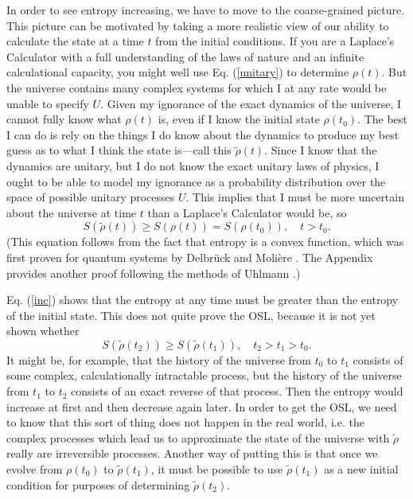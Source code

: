 \documentclass[12pt]{article}
\begin{document}
In order to see entropy increasing, we have to move to the coarse-grained picture.  This picture can be motivated by taking a more realistic view of our ability to calculate the state at a time $t$ from the initial conditions.  If you are a Laplace's Calculator with a full understanding of the laws of nature and an infinite calculational capacity, you might well use Eq. (\ref{unitary}) to determine $\rho(t)$.  But the universe contains many complex systems for which I at any rate would be unable to specify $U$.  Given my ignorance of the exact dynamics of the universe, I cannot fully know what $\rho(t)$ is, even if I know the initial state $\rho(t_0)$.  The best I can do is rely on the things I do know about the dynamics to produce my best guess as to what I think the state is---call this $\tilde{\rho}(t)$.  Since I know that the dynamics are unitary, but I do not know the exact unitary laws of physics, I ought to be able to model my ignorance as a probability distribution over the space of possible unitary processes $U$.  This implies that I must be more uncertain about the universe at time $t$ than a Laplace's Calculator would be, so 
\begin{equation}\label{inc}
S(\tilde{\rho}(t)) \ge S(\rho(t)) = S(\rho(t_0)), \quad t > t_0.
\end{equation}
(This equation follows from the fact that entropy is a convex function, which was first proven for quantum systems by Delbr\"uck and Moli\`ere \cite{convex}.  The Appendix provides another proof following the methods of Uhlmann \cite{Uhlmann}.)

Eq. (\ref{inc}) shows that the entropy at any time must be greater than the entropy of the initial state.  This does not quite prove the OSL, because it is not yet shown whether
\begin{equation}
S(\tilde{\rho}(t_2)) \ge S(\tilde{\rho}(t_1)), \quad t_2 > t_1 > t_0.
\end{equation}
It might be, for example, that the history of the universe from $t_0$ to $t_1$ consists of some complex, calculationally intractable process, but the history of the universe from $t_1$ to $t_2$ consists of an exact reverse of that process.  Then the entropy would increase at first and then decrease again later.  In order to get the OSL, we need to know that this sort of thing does not happen in the real world, i.e. the complex processes which lead us to approximate the state of the universe with $\tilde{\rho}$ really are irreversible processes.  Another way of putting this is that once we evolve from $\rho(t_0)$ to $\tilde{\rho}(t_1)$, it must be possible to use $\tilde{\rho}(t_1)$ as a new initial condition for purposes of determining $\tilde{\rho}(t_2)$.
\end{document}
